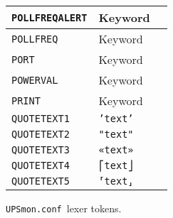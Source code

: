 \documentclass[12pt]{article}
\newcommand{\UPSmonconf}{\textcolor{UPSMONCOLOUR}{\texttt{UPSmon.conf}}}
\begin{document}
\begin{figure}[ht]
\begin{center}
\begin{tabular}{|l|l|p{0.4\LinePrinterwidth}|}
\texttt{POLLFREQALERT}   & Keyword                \\ \hline
\texttt{POLLFREQ}        & Keyword                \\ \hline
\texttt{PORT}            & Keyword                \\ \hline
\texttt{POWERVAL}        & Keyword                \\ \hline
\texttt{PRINT}           & Keyword                \\ \hline
\texttt{QUOTETEXT1}      & \texttt{'text'}        \\ \hline
\texttt{QUOTETEXT2}      & \texttt{"text"}        \\ \hline
\texttt{QUOTETEXT3}      & \texttt{«text»}        \\ \hline
\texttt{QUOTETEXT4}      & \texttt{⎡text⎦}        \\ \hline
\texttt{QUOTETEXT5}      & \texttt{⸢text⸥}        \\ \hline
\end{tabular}
\caption{\UPSmonconf\ lexer tokens.\label{fig:tokens1}}
\end{center}
\end{figure}
\end{document}
